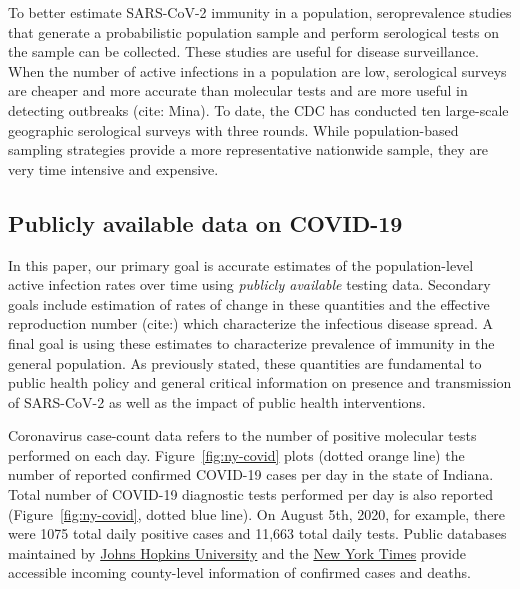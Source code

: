 \documentclass[11pt]{amsart}
\begin{document}
To better estimate SARS-CoV-2 immunity in a population, seroprevalence studies that generate a probabilistic population sample and perform serological tests on the sample can be collected.  These studies are useful for disease surveillance. When the number of active infections in a population are low, serological surveys are cheaper and more accurate than molecular tests and are more useful in detecting outbreaks (cite: Mina). To date, the CDC has conducted ten large-scale geographic serological surveys with three rounds.  While population-based sampling strategies provide a more representative nationwide sample, they are very time intensive and expensive.

\subsection{Publicly available data on COVID-19}
\label{section:testinginfo}

In this paper, our primary goal is accurate estimates of the population-level active infection rates over time using \emph{publicly available} testing data.  Secondary goals include estimation of rates of change in these quantities and the effective reproduction number (cite:) which characterize the infectious disease spread.  A final goal is using these estimates to characterize prevalence of immunity in the general population.  As previously stated, these quantities are fundamental to public health policy and general critical information on presence and transmission of SARS-CoV-2 as well as the impact of public health  interventions.



Coronavirus case-count data refers to the number of positive molecular tests performed on each day.  Figure~\ref{fig:ny-covid} plots (dotted orange line) the number of reported confirmed COVID-19 cases per day in the state of Indiana.  Total number of COVID-19 diagnostic tests performed per day is also reported (Figure~\ref{fig:ny-covid}, dotted blue line). On August 5th, 2020, for example, there were 1075 total daily positive cases and 11,663 total daily tests.  Public databases maintained by \href{https://bit.ly/2UqFSuA}{Johns Hopkins University} and the \href{https://bit.ly/2vUHfrK}{New York Times} provide accessible incoming county-level information of confirmed cases and deaths.
\end{document}
